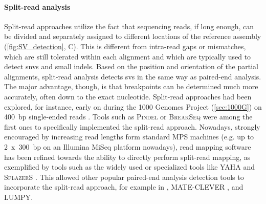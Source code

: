\paragraph{Split-read analysis}
Split-read approaches utilize the fact that sequencing reads, if long enough,
can be divided and separately assigned to different locations of the
reference assembly  (\cref{fig:SV_detection}, C). This is different from intra-read
gaps or mismatches, which are still tolerated within each alignment and
which are typically used to detect \acp{snv} and small indels.
Based on the position and orientation of the partial alignments, split-read
analysis detects \acp{sv} in the same way as paired-end analysis. The major
advantage, though, is that breakpoints can be determined much more accurately,
often down to the exact nucleotide.
Split-read approaches had been explored, for instance, early on during the
1000 Genomes Project (\cref{sec:1000G}) on 400~bp single-ended reads
\citep{Zhang2011}. Tools such as \textsc{Pindel} \citep{Ye2009} or
\textsc{BreakSeq} \citep{Lam2010} were among the first ones to specifically
implemented the split-read approach. Nowadays, strongly encouraged by increasing
read lengths form standard MPS machines (e.g. up to 2~x~300~bp on an Illumina
MiSeq platform nowadays), read mapping software has been refined towards the
ability to directly perform split-read mapping, as exemplified by tools such as
the widely used \bwamem or specialized tools like \textsc{YAHA}
\citep{Faust2012} and \textsc{SplazerS} \citep{Emde2012}.
This allowed other popular paired-end analysis detection tools to incorporate
the split-read approach, for example in \delly, \textsc{MATE-CLEVER}
\citep{Marschall2013}, and \textsc{LUMPY}.


